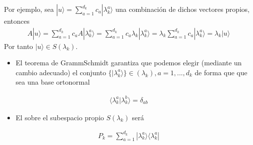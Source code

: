 \documentclass[letterpaper,10pt,english]{jupyterBook}
\newcommand{\ket}[1]{|#1\rangle}
\newcommand{\braket}[2]{\langle #1|#2\rangle}
\newcommand{\ketbra}[2]{| #1\rangle \langle #2 |}
\begin{document}
\sphinxAtStartPar
Por ejemplo,  sea \(\ket{u} = \sum_{a=1}^{d_k} c_a\ket{\lambda^a_k} \) una combinación de dichos vectores propios, entonces
\label{equation:docs/Part_01_Formalismo/Chapter_01_02_Formalismo_matemático/01_03_Operadores_myst:89ccae85-eb30-4573-ab14-f95dd97acdb9}\begin{eqnarray}
A \ket{u} 
=  \sum_{a=1}^{d_k} c_a A\ket{\lambda^a_k}  =  \sum_{a=1}^{d_k} c_a \lambda_k\ket{\lambda^a_k}  =   \lambda_k \sum_{a=1}^{d_k} c_a \ket{\lambda^a_k}  =\lambda_k\ket{u}
\end{eqnarray}
\sphinxAtStartPar
Por tanto \(\ket{u}\in S(\lambda_k)\).
\begin{itemize}
\item {} 
\sphinxAtStartPar
El teorema de Gramm\sphinxhyphen{}Schmidt garantiza que podemos elegir (mediante un cambio adecuado) el conjunto \(\{\ket{\lambda_{k}^a}\}\in (\lambda_k), a=1,...,d_k\) de forma que que sea una  base ortonormal

\end{itemize}
\begin{equation*}
\begin{split}\braket{\lambda_{k}^a}{\lambda_{k}^b}=\delta_{ab}\end{split}
\end{equation*}\begin{itemize}
\item {} 
\sphinxAtStartPar
El  sobre el subespacio propio \(S(\lambda_k)\) será

\end{itemize}
\begin{equation*}
\begin{split}
P_k = \sum_{a=1}^{d_k} \ketbra{\lambda_{k}^a}{\lambda_{k}^a}
\end{split}
\end{equation*}
\end{document}
